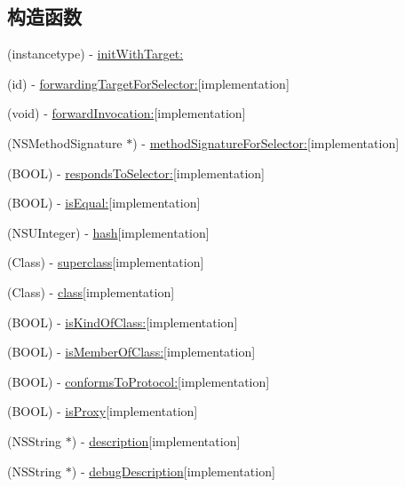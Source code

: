 \subsection*{构造函数}
\begin{DoxyCompactItemize}
\item 
(instancetype) -\/ \hyperlink{interface_m_a_r_weak_proxy_ac58e95da7a6b7acbca12c3a7c29dd0cb}{init\+With\+Target\+:}
\item 
(id) -\/ \hyperlink{interface_m_a_r_weak_proxy_a99434c93094d59a1585a5648dce3cc9b}{forwarding\+Target\+For\+Selector\+:}{\ttfamily  \mbox{[}implementation\mbox{]}}
\item 
(void) -\/ \hyperlink{interface_m_a_r_weak_proxy_a05a5c42b8f37b84e705f35e56c302424}{forward\+Invocation\+:}{\ttfamily  \mbox{[}implementation\mbox{]}}
\item 
(N\+S\+Method\+Signature $\ast$) -\/ \hyperlink{interface_m_a_r_weak_proxy_ab0f6ac1eea62ad0c929950610e890bb6}{method\+Signature\+For\+Selector\+:}{\ttfamily  \mbox{[}implementation\mbox{]}}
\item 
(B\+O\+OL) -\/ \hyperlink{interface_m_a_r_weak_proxy_a68992024ce8112aaa4ac633a36580c3f}{responds\+To\+Selector\+:}{\ttfamily  \mbox{[}implementation\mbox{]}}
\item 
(B\+O\+OL) -\/ \hyperlink{interface_m_a_r_weak_proxy_a5d1a39a0cdc733ef8cab5a81c0cb4709}{is\+Equal\+:}{\ttfamily  \mbox{[}implementation\mbox{]}}
\item 
(N\+S\+U\+Integer) -\/ \hyperlink{interface_m_a_r_weak_proxy_a03b12f680244eefbb2cc686d3d080423}{hash}{\ttfamily  \mbox{[}implementation\mbox{]}}
\item 
(Class) -\/ \hyperlink{interface_m_a_r_weak_proxy_a01b83d4be99392aaf2b5927d77b95d2a}{superclass}{\ttfamily  \mbox{[}implementation\mbox{]}}
\item 
(Class) -\/ \hyperlink{interface_m_a_r_weak_proxy_a37f22c27e38c3245d990b70373f246e2}{class}{\ttfamily  \mbox{[}implementation\mbox{]}}
\item 
(B\+O\+OL) -\/ \hyperlink{interface_m_a_r_weak_proxy_a25eedfc55ab1bbaacd877435685e8447}{is\+Kind\+Of\+Class\+:}{\ttfamily  \mbox{[}implementation\mbox{]}}
\item 
(B\+O\+OL) -\/ \hyperlink{interface_m_a_r_weak_proxy_a7448df6a72c1c6935ae1cf7f172c8bf6}{is\+Member\+Of\+Class\+:}{\ttfamily  \mbox{[}implementation\mbox{]}}
\item 
(B\+O\+OL) -\/ \hyperlink{interface_m_a_r_weak_proxy_abc6ecb34f5f4257836ae198608c0e592}{conforms\+To\+Protocol\+:}{\ttfamily  \mbox{[}implementation\mbox{]}}
\item 
(B\+O\+OL) -\/ \hyperlink{interface_m_a_r_weak_proxy_a2dbb569680d189fcc134482a436d8ebf}{is\+Proxy}{\ttfamily  \mbox{[}implementation\mbox{]}}
\item 
(N\+S\+String $\ast$) -\/ \hyperlink{interface_m_a_r_weak_proxy_a249cbeb534d61a39b0b700b286bfc39b}{description}{\ttfamily  \mbox{[}implementation\mbox{]}}
\item 
(N\+S\+String $\ast$) -\/ \hyperlink{interface_m_a_r_weak_proxy_ae593d93f0a72a9f2fb75fe135749f905}{debug\+Description}{\ttfamily  \mbox{[}implementation\mbox{]}}
\end{DoxyCompactItemize}
